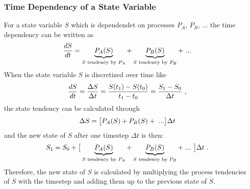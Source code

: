 \documentclass[a4paper,10pt,english]{sphinxmanual}
\begin{document}
\subsubsection{Time Dependency of a State Variable}
\label{architecture:time-dependency-of-a-state-variable}
For a state variable \(S\) which is dependendet on processes \(P_A\), \(P_B\), ... the time dependency can be written as
\begin{gather}
\begin{split}\frac{dS}{dt} = \underbrace{P_A(S)}_{S \textrm{ tendency by }P_A} + \underbrace{P_B(S)}_{S \textrm{ tendency by } P_B} + \ ...\end{split}\notag
\end{gather}
When the state variable \(S\) is discretized over time like
\begin{gather}
\begin{split}\frac{dS}{dt} = \frac{\Delta S}{\Delta t} = \frac{S(t_1) - S(t_0)}{t_1 - t_0} = \frac{S_1 - S_0}{\Delta t} ~,\end{split}\notag
\end{gather}
the state tendency can be calculated through
\begin{gather}
\begin{split}\Delta S = \big[ P_A(S) + P_B(S) + \ ... \big] \Delta t\end{split}\notag
\end{gather}
and the new state of \(S\) after one timestep \(\Delta t\) is then:
\begin{gather}
\begin{split}S_1 = S_0 + \big[ \underbrace{P_A(S)}_{S \textrm{ tendency by }P_A} + \underbrace{P_B(S)}_{S \textrm{ tendency by }P_B} + \ ... \ \big] \Delta t  ~.\end{split}\notag
\end{gather}
Therefore, the new state of \(S\) is calculated by multiplying the process tendencies of \(S\) with the timestep and adding them up to the previous state of \(S\).
\end{document}
